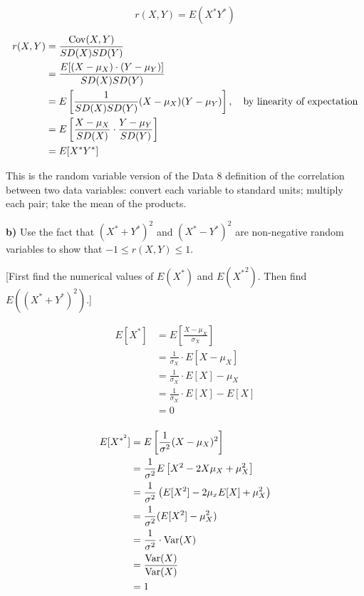 \documentclass[11pt]{article}
\begin{document}
\[
r(X, Y) = E(X^*Y^*)
\]


\begin{align*}
	r(X,Y) &= \frac{\operatorname{Cov}(X,Y)}{SD(X)SD(Y)} \\
	&=  \frac{E[(X-\mu_{X}) \cdot (Y-\mu _{Y})]}{SD(X)SD(Y)} \\
	&= E\left[ \frac{1}{SD(X)SD(Y)} (X-\mu _{X}) (Y-\mu _{Y})\right], \quad \text{by linearity of expectation}\\ 
	&= E\left[ \frac{X-\mu _{X}}{SD(X)} \cdot \frac{Y-\mu _{Y}}{SD(Y)} \right] \\
	&= E[X^{*}Y^{*}] \\
\end{align*}



This is the random variable version of the Data 8 definition of the
correlation between two data variables: convert each variable to
standard units; multiply each pair; take the mean of the products.

\textbf{b)} Use the fact that \((X^* + Y^*)^2\) and \((X^* - Y^*)^2\)
are non-negative random variables to show that \(-1 \le r(X, Y) \le 1\).

{[}First find the numerical values of \(E(X^*)\) and
\(E\left({X^*}^2\right)\). Then find \(E\left((X^* + Y^*)^2\right)\).{]}

\begin{align*}
	E[X^{*}] &= E\left[\frac{X-\mu _{X}}{\sigma_{X}}\right] \\ 
		 &= \frac{1}{\sigma_{X}} \cdot E[X-\mu_{X}] \\
		 &= \frac{1}{\sigma_{X}} \cdot E[X] - \mu_{X}  \\
		 &= \frac{1}{\sigma_{X}} \cdot E[X] -E[X] \\
		 &= 0 \\
\end{align*}


\begin{align*}
	E[X^{*^{2}}] &= E\left[\frac{1}{\sigma^{2}} (X-\mu _{X})^{2}\right] \\
		     &= \frac{1}{\sigma^{2}}E\left[ X^{2} -2X\mu _{X} + \mu _{X}^{2}\right] \\
		     &= \frac{1}{\sigma^{2}}\left( E[X^{2}] - 2\mu _{x}E[X] + \mu ^{2}_{X} \right)   \\
		     &= \frac{1}{\sigma^{2}} (E[X^{2}] -\mu _{X}^{2}) \\
		     &= \frac{1}{\sigma^{2}} \cdot \operatorname{Var}(X) \\
		     &= \frac{\operatorname{Var}(X)}{\operatorname{Var}(X)} \\
		     &= 1 \\
\end{align*}
\end{document}
